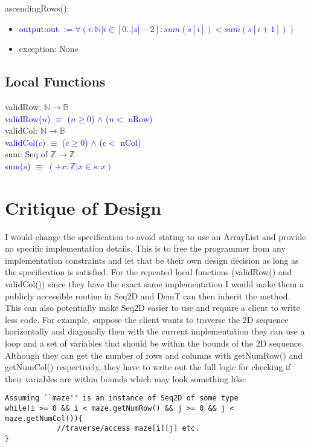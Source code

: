 \documentclass[12pt]{article}
\begin{document}
\noindent ascendingRows():
\begin{itemize}
\item \textcolor{blue}{output:out $:= \forall (i : \mathbb{N} | i \in [0..|s|-2] : sum(s[i]) < sum(s[i+1])) $}
\item exception: None
\end{itemize}

\subsection*{Local Functions}

\noindent validRow: $\mathbb{N} \rightarrow \mathbb{B}$\\
\noindent \textcolor{blue}{validRow($n$) $\equiv$ ($n \geq 0$) $\land$ ($n < $ nRow)}\\

\noindent validCol: $\mathbb{N} \rightarrow \mathbb{B}$\\
\noindent \textcolor{blue}{validCol($c$) $\equiv$ ($c \geq 0$) $\land$ ($c < $ nCol)}\\
  
\noindent sum: Seq of $\mathbb{Z} \rightarrow \mathbb{Z}$\\
\noindent \textcolor{blue}{sum($s$) $\equiv$ $(+x : \mathbb{Z} | x \in s: x)$}



\newpage

\section*{Critique of Design}


I would change the specification to avoid stating to use an ArrayList and provide no specific implementation details. This is to free the programmer from any implementation constraints and let that be their own design decision as long as the specification is satisfied. For the repeated local functions (validRow() and validCol()) since they have the exact same implementation I would make them a publicly accessible routine in Seq2D and DemT can then inherit the method. \\

This can also potentially make Seq2D easier to use and require a client to write less code. For example, suppose the client wants to traverse the 2D sequence horizontally and diagonally then with the current implementation they can use a loop and a set of variables that should be within the bounds of the 2D sequence. Although they can get the number of rows and columns with getNumRow() and getNumCol() respectively, they have to write out the full logic for checking if their variables are within bounds which may look something like:\\
\begin{verbatim}
Assuming ``maze'' is an instance of Seq2D of some type
while(i >= 0 && i < maze.getNumRow() && j >= 0 && j < maze.getNumCol()){
			//traverse/access maze[i][j] etc.
}
\end{verbatim}
\end{document}
